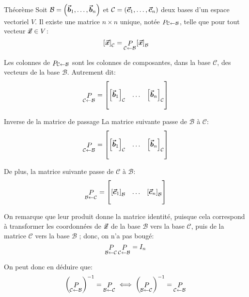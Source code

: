 \documentclass[a4paper]{article}
\begin{document}
\begin{parag}{Théorème}
    Soit $\mathcal{B} = \left(\bvec{b}_1, \ldots, \bvec{b}_n\right)$ et $\mathcal{C} = \left(\bvec{c}_1, \ldots, \bvec{c}_n\right)$ deux bases d'un espace vectoriel $V$. Il existe une matrice $n \times n$ unique, notée $\mathop{P}_{\mathcal{C} \leftarrow \mathcal{B}}$, telle que pour tout vecteur $\bm{\protect\vec{x}} \in V$:
    \[\left[\bvec{x}\right]_{\mathcal{C}} = \matricepassage{C}{B}\left[\bvec{x}\right]_{\mathcal{B}}\]

    Les colonnes de $\mathop{P}_{\mathcal{C} \leftarrow \mathcal{B}}$ sont les colonnes de composantes, dans la base $\mathcal{C}$, des vecteurs de la base $\mathcal{B}$. Autrement dit:
    \[\matricepassage{C}{B} = \begin{bmatrix}  &  &  \\ \left[\bvec{b}_1\right]_{\mathcal{C}} & \ldots & \left[\bvec{b}_n\right]_{\mathcal{C}} \\  &  &  \end{bmatrix} \]
\end{parag}

\begin{parag}{Inverse de la matrice de passage}
    La matrice suivante passe de $\mathcal{B}$ à $\mathcal{C}$:
    \[\matricepassage{C}{B} = \begin{bmatrix}  &  &  \\ \left[\bvec{b}_1\right]_{\mathcal{C}} & \ldots & \left[\bvec{b}_n\right]_{\mathcal{C}} \\  &  &  \end{bmatrix} \]

    De plus, la matrice suivante passe de $\mathcal{C}$ à $\mathcal{B}$:
    \[\matricepassage{B}{C} = \begin{bmatrix}  &  &  \\ \left[\bvec{c}_1\right]_{\mathcal{B}} & \ldots & \left[\bvec{c}_n\right]_{\mathcal{B}} \\  &  &  \end{bmatrix} \]

    On remarque que leur produit donne la matrice identité, puisque cela correspond à transformer les coordonnées de $\bm{\protect\vec{x}}$ de la base $\mathcal{B}$ vers la base $\mathcal{C}$, puis de la matrice $\mathcal{C}$ vers la base $\mathcal{B}$ ; donc, on n'a pas bougé:
    \[\mathop{P}_{\mathcal{B} \leftarrow \mathcal{C}}\mathop{P}_{\mathcal{C} \leftarrow \mathcal{B}} = I_n\]

    On peut donc en déduire que:
    \[\left(\matricepassage{C}{B}\right)^{-1} = \matricepassage{B}{C} \iff \left(\matricepassage{B}{C}\right)^{-1} = \matricepassage{C}{B} \]
\end{parag}
\end{document}
